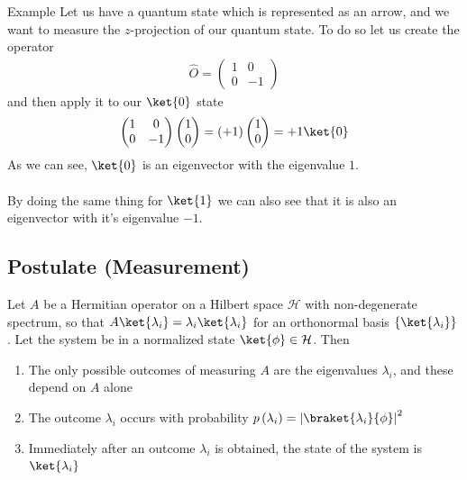 \begin{parag}{Example}
	Let us have a quantum state which is represented as an arrow, and we want to measure the $z$-projection of our quantum state. To do so let us create the operator 
	\begin{align*} 
		\hat{O} = \begin{pmatrix} 1 & 0 \\ 0 & -1 \end{pmatrix}  
	\end{align*}
	and then apply it to our $\ket{0}$ state 
	\begin{align*} 
		\begin{pmatrix} 1 & 0 \\ 0 & -1 \end{pmatrix}  \begin{pmatrix} 1 \\ 0 \end{pmatrix} = \left(+1\right)\begin{pmatrix} 1 \\ 0 \end{pmatrix} = +1 \ket{0}
	\end{align*}
	As we can see, $\ket{0}$ is an eigenvector with the eigenvalue $1$.\\
	$ $\\
	By doing the same thing for $\ket{1}$ we can also see that it is also an eigenvector with it's eigenvalue $-1$.
\end{parag}
\subsection{Postulate (Measurement)}


    Let $A$ be a Hermitian operator on a Hilbert space $\mathcal{H}$ with non-degenerate spectrum, so that $A \ket{\lambda_i} = \lambda_i \ket{\lambda_i}$ for an orthonormal basis $\left\{\ket{\lambda_i}\right\}$. Let the system be in a normalized state $\ket{\phi} \in \mathcal{H}$. Then 
	\begin{enumerate}
	    \item The only possible outcomes of measuring $A$ are the eigenvalues $\lambda_i$, and these depend on $A$ alone
		\item The outcome $\lambda_i$ occurs with probability $p\left(\lambda_i\right) = \left|\braket{\lambda_i}{\phi}\right|^2$
		\item Immediately after an outcome $\lambda_i$ is obtained, the state of the system is $\ket{\lambda_i}$
	\end{enumerate}
	



